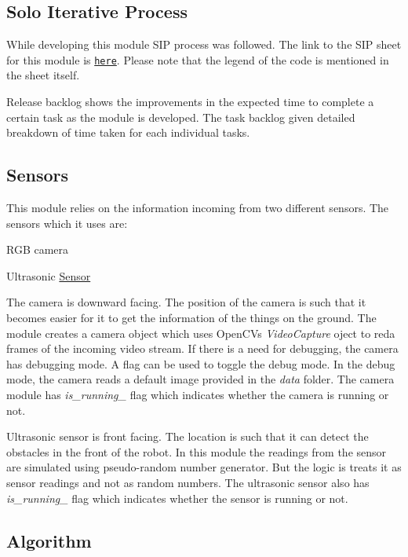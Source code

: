\subsection*{Solo Iterative Process}

While developing this module S\+IP process was followed. The link to the S\+IP sheet for this module is \href{https://docs.google.com/spreadsheets/d/1xeEtkg9tZwtrnPBAMPW0ByWKBNMoUEidjYDhUrIFllk/edit?usp=sharing}{\tt here}. Please note that the legend of the code is mentioned in the sheet itself.

Release backlog shows the improvements in the expected time to complete a certain task as the module is developed. The task backlog given detailed breakdown of time taken for each individual tasks.

\subsection*{Sensors}

This module relies on the information incoming from two different sensors. The sensors which it uses are\+:
\begin{DoxyItemize}
\item R\+GB camera
\item Ultrasonic \hyperlink{class_sensor}{Sensor}
\end{DoxyItemize}

The camera is downward facing. The position of the camera is such that it becomes easier for it to get the information of the things on the ground. The module creates a camera object which uses Open\+CV\textquotesingle{}s {\itshape Video\+Capture} oject to reda frames of the incoming video stream. If there is a need for debugging, the camera has debugging mode. A flag can be used to toggle the debug mode. In the debug mode, the camera reads a default image provided in the {\itshape data} folder. The camera module has {\itshape is\+\_\+running\+\_\+} flag which indicates whether the camera is running or not.

Ultrasonic sensor is front facing. The location is such that it can detect the obstacles in the front of the robot. In this module the readings from the sensor are simulated using pseudo-\/random number generator. But the logic is treats it as sensor readings and not as random numbers. The ultrasonic sensor also has {\itshape is\+\_\+running\+\_\+} flag which indicates whether the sensor is running or not.

\subsection*{Algorithm}

